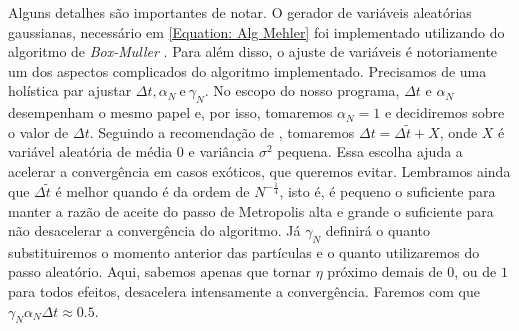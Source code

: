  Alguns detalhes são importantes de notar. O gerador de variáveis aleatórias gaussianas, necessário em \ref{Equation: Alg Mehler} foi implementado utilizando do algoritmo de \textit{Box-Muller} \cite{NormalVariable}. Para além disso, o ajuste de variáveis é notoriamente um dos aspectos complicados do algoritmo implementado. Precisamos de uma holística par ajustar $\Delta t, \alpha_N \ \text{e} \ \gamma_N$. No escopo do nosso programa, $\Delta t$ e $\alpha_N$ desempenham o mesmo papel e, por isso, tomaremos $\alpha_N = 1$ e decidiremos sobre o valor de $\Delta t$. Seguindo a recomendação de \cite[Capítulo~5]{handbookmontecarlo}, tomaremos $\Delta t = \Delta\tilde{t} + X$, onde $X$ é variável aleatória de média $0$ e variância $\sigma^2$ pequena. Essa escolha ajuda a acelerar a convergência em casos exóticos, que queremos evitar. Lembramos ainda que $\Delta \tilde{t}$ é melhor quando é da ordem de $N^{-\frac{1}{4}}$, isto é, é pequeno o suficiente para manter a razão de aceite do passo de Metropolis alta e grande o suficiente para não desacelerar a convergência do algoritmo. Já $\gamma_N$ definirá o quanto substituiremos o momento anterior das partículas e o quanto utilizaremos do passo aleatório. Aqui, sabemos apenas que tornar $\eta$ próximo demais de $0$, ou de $1$ para todos efeitos, desacelera intensamente a convergência. Faremos com que $\gamma_N \alpha_N \Delta t \approx 0.5$.
 


